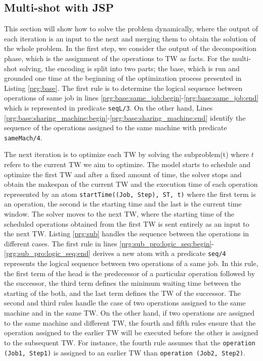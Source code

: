 \documentclass{tlp} %
\begin{document}
\subsection{Multi-shot with JSP}
This section will show how to solve the problem dynamically, where the output of each iteration is an input to the next and merging them to obtain the solution of the whole problem. In the first step, we consider the output of the decomposition phase, which is the assignment of the operations to TW as facts. For the multi-shot solving, the encoding is split into two parts; the base, which is run and grounded one time at the beginning of the optimization process presented in Listing \ref{prg:base}. The first rule is to determine the logical sequence between operations of same job in lines \ref{prg:base:same_job:begin}-\ref{prg:base:same_job:end} which is represented in predicate \lstinline{seqL/3}. On the other hand, Lines \ref{prg:base:sharing_machine:begin}-\ref{prg:base:sharing_machine:end} identify the sequence of the operations assigned to the same machine with predicate \lstinline{sameMach/4}.



The next iteration is to optimize each TW by solving the subproblem(t) where $t$ refers to the current TW we aim to optimize. The model starts to schedule and optimize the first TW and after a fixed amount of time, the solver stops and obtain the makespan of the current TW and the execution time of each operation represented by an atom \lstinline{startTime((Job, Step), ST, t)} where the first term is an operation, the second is the starting time and the last is the current time window. The solver moves to the next TW, where the starting time of the scheduled operations obtained from the first TW is sent entirely as an input to the next TW. Listing \ref{prg:sub} handles the sequence between the operations in different cases. The first rule in lines \ref{prg:sub_pro:logic_seq:begin}-\ref{prg:sub_pro:logic_seq:end} derives a new atom with a predicate \lstinline{seq/4} represents the logical sequence between two operations of a same job. In this rule, the first term of the head is the predecessor of a particular operation followed by the successor, the third term defines the minimum waiting time between the starting of the both, and the last term defines the TW of the successor. The second and third rules handle the case of two operations assigned to the same machine and in the same TW. On the other hand, if two operations are assigned to the same machine and different TW, the fourth and fifth rules ensure that the operation assigned to the earlier TW will be executed before the other is assigned to the subsequent TW. For instance, the fourth rule assumes that the \lstinline{operation (Job1, Step1)} is assigned to an earlier TW than \lstinline{operation (Job2, Step2)}.
\end{document}
